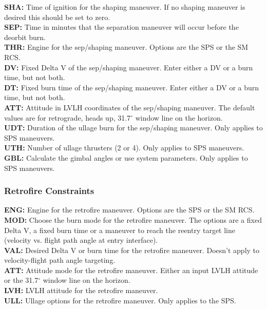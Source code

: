 \documentclass[11pt]{article} %
\begin{document}
\textbf{SHA:} Time of ignition for the shaping maneuver. If no shaping maneuver is desired this should be set to zero.\\
\textbf{SEP:} Time in minutes that the separation maneuver will occur before the deorbit burn.\\
\textbf{THR:} Engine for the sep/shaping maneuver. Options are the SPS or the SM RCS.\\
\textbf{DV:} Fixed Delta V of the sep/shaping maneuver. Enter either a DV or a burn time, but not both.\\
\textbf{DT:} Fixed burn time of the sep/shaping maneuver. Enter either a DV or a burn time, but not both.\\
\textbf{ATT:} Attitude in LVLH coordinates of the sep/shaping maneuver. The default values are for retrograde, heads up, 31.7$^{\circ}$ window line on the horizon.\\

\textbf{UDT:} Duration of the ullage burn for the sep/shaping maneuver. Only applies to SPS maneuvers.\\
\textbf{UTH:} Number of ullage thrusters (2 or 4). Only applies to SPS maneuvers.\\
\textbf{GBL:} Calculate the gimbal angles or use system parameters. Only applies to SPS maneuvers.\\

\subsubsection{Retrofire Constraints}

\textbf{ENG:} Engine for the retrofire maneuver. Options are the SPS or the SM RCS.\\
\textbf{MOD:} Choose the burn mode for the retrofire maneuver. The options are a fixed Delta V, a fixed burn time or a maneuver to reach the reentry target line (velocity vs. flight path angle at entry interface).\\
\textbf{VAL:} Desired Delta V or burn time for the retrofire maneuver. Doesn't apply to velocity-flight path angle targeting.\\
\textbf{ATT:} Attitude mode for the retrofire maneuver. Either an input LVLH attitude or the 31.7$^{\circ}$ window line on the horizon.\\
\textbf{LVH:} LVLH attitude for the retrofire maneuver.\\
\textbf{ULL:} Ullage options for the retrofire maneuver. Only applies to the SPS.\\
\end{document}

